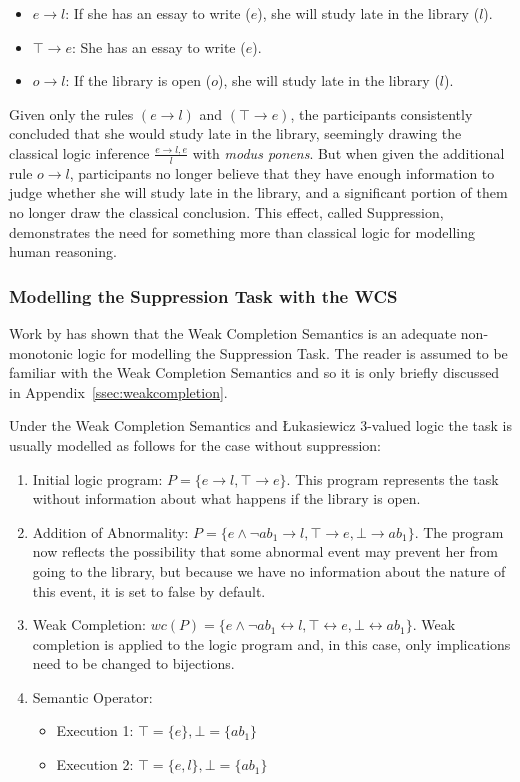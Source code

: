 \documentclass{article}
\begin{document}
\begin{itemize}
\item $e \rightarrow l$: If she has an essay to write ($e$), she will study late in the library ($l$).
\item $\top \rightarrow e$: She has an essay to write ($e$).
\item $o\rightarrow l$: If the library is open ($o$), she will study late in the library ($l$).
\end{itemize}

Given only the rules $(e \rightarrow l)$ and $(\top \rightarrow e)$, the participants consistently concluded that she would study late in the library, seemingly drawing the classical logic inference $\frac{e \rightarrow l, e}{l}$ with \textit{modus ponens}. But when given the additional rule $o\rightarrow l$, participants no longer believe that they have enough information to judge whether she will study late in the library, and a significant portion of them no longer draw the classical conclusion. This effect, called Suppression, demonstrates the need for something more than classical logic for modelling human reasoning.

\subsubsection{Modelling the Suppression Task with the WCS}
Work by \cite{dietz2014modeling} has shown that the Weak Completion Semantics is an adequate non-monotonic logic for modelling the Suppression Task. The reader is assumed to be familiar with the Weak Completion Semantics and so it is only briefly discussed in Appendix~\ref{ssec:weakcompletion}.

Under the Weak Completion Semantics and \L ukasiewicz 3-valued logic the task is usually modelled as follows for the case without suppression:
\begin{enumerate}
\item Initial logic program: $P = \{e \rightarrow l, \top \rightarrow e \}$. This program represents the task without information about what happens if the library is open.
\item Addition of Abnormality: $P = \{e \land \lnot ab_1 \rightarrow l, \top \rightarrow e, \bot \rightarrow ab_1 \}$. The program now reflects the possibility that some abnormal event may prevent her from going to the library, but because we have no information about the nature of this event, it is set to false by default.
\item Weak Completion: $wc(P) = \{e \land \lnot ab_1 \leftrightarrow l, \top \leftrightarrow e, \bot \leftrightarrow ab_1 \}$. Weak completion is applied to the logic program and, in this case, only implications need to be changed to bijections.
\item Semantic Operator:
\begin{itemize}
\item Execution 1: $\top=\{e\}, \bot=\{ab_1\}$
\item Execution 2: $\top=\{e,l\}, \bot=\{ab_1\}$
\end{itemize}
\end{enumerate}
\end{document}
